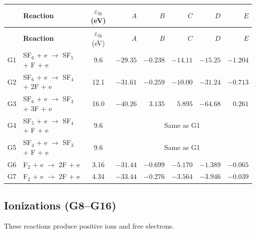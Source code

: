 \documentclass[11pt,a4paper]{article}
\begin{document}
\begin{longtable}{clcrrrrr}
\toprule
 & \textbf{Reaction} & $\varepsilon_\text{th}$ (eV) & $A$ & $B$ & $C$ & $D$ & $E$ \\
\midrule
\endfirsthead
\midrule
 & \textbf{Reaction} & $\varepsilon_\text{th}$ (eV) & $A$ & $B$ & $C$ & $D$ & $E$ \\
\midrule
\endhead
G1 & SF$_6$ + e $\to$ SF$_5$ + F + e          & 9.6  & $-29.35$ & $-0.238$ & $-14.11$ & $-15.25$ & $-1.204$ \\
G2 & SF$_6$ + e $\to$ SF$_4$ + 2F + e         & 12.1 & $-31.61$ & $-0.259$ & $-10.00$ & $-31.24$ & $-0.713$ \\
G3 & SF$_6$ + e $\to$ SF$_3$ + 3F + e         & 16.0 & $-40.26$ & $3.135$  & $5.895$  & $-64.68$ & $0.261$ \\
G4 & SF$_5$ + e $\to$ SF$_4$ + F + e          & 9.6  & \multicolumn{5}{c}{Same as G1} \\
G5 & SF$_4$ + e $\to$ SF$_3$ + F + e          & 9.6  & \multicolumn{5}{c}{Same as G1} \\
G6 & F$_2$ + e $\to$ 2F + e                   & 3.16 & $-31.44$ & $-0.699$ & $-5.170$ & $-1.389$ & $-0.065$ \\
G7 & F$_2$ + e $\to$ 2F + e                   & 4.34 & $-33.44$ & $-0.276$ & $-3.564$ & $-3.946$ & $-0.039$ \\
\bottomrule
\end{longtable}

\subsection{Ionizations (G8--G16)}

These reactions produce positive ions and free electrons.
\end{document}
